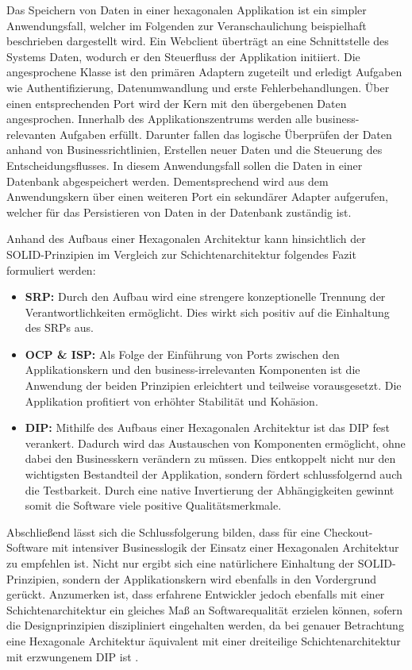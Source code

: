 Das Speichern von Daten in einer hexagonalen Applikation ist ein simpler Anwendungsfall, welcher im Folgenden zur Veranschaulichung beispielhaft beschrieben dargestellt wird. Ein Webclient überträgt an eine Schnittstelle des Systems Daten, wodurch er den Steuerfluss der Applikation initiiert. Die angesprochene Klasse ist den primären Adaptern zugeteilt und erledigt Aufgaben wie Authentifizierung, Datenumwandlung und erste Fehlerbehandlungen. Über einen entsprechenden Port wird der Kern mit den übergebenen Daten angesprochen. Innerhalb des Applikationszentrums werden alle business-relevanten Aufgaben erfüllt. Darunter fallen das logische Überprüfen der Daten anhand von Businessrichtlinien, Erstellen neuer Daten und die Steuerung des Entscheidungsflusses. In diesem Anwendungsfall sollen die Daten in einer Datenbank abgespeichert werden. Dementsprechend wird aus dem Anwendungskern über einen weiteren Port ein sekundärer Adapter aufgerufen, welcher für das Persistieren von Daten in der Datenbank zuständig ist.

Anhand des Aufbaus einer Hexagonalen Architektur kann hinsichtlich der SOLID-Prinzipien im Vergleich zur Schichtenarchitektur folgendes Fazit formuliert werden:

\begin{itemize}[topsep=-2pt]
	\item \textbf{\acrshort{SRP}: } {Durch den Aufbau wird eine strengere konzeptionelle Trennung der Verantwortlichkeiten ermöglicht. Dies wirkt sich positiv auf die Einhaltung des \acrlong{SRP}s aus.}
	\item \textbf{\acrshort{OCP} \& \acrshort{ISP}: } {Als Folge der Einführung von Ports zwischen den Applikationskern und den business-irrelevanten Komponenten ist die Anwendung der beiden Prinzipien erleichtert und teilweise vorausgesetzt. Die Applikation profitiert von erhöhter Stabilität und Kohäsion. }
	\item \textbf{\acrshort{DIP}: } {Mithilfe des Aufbaus einer Hexagonalen Architektur ist das \acrlong{DIP} fest verankert. Dadurch wird das Austauschen von Komponenten ermöglicht, ohne dabei den Businesskern verändern zu müssen. Dies entkoppelt nicht nur den wichtigsten Bestandteil der Applikation, sondern fördert schlussfolgernd auch die Testbarkeit. Durch eine native Invertierung der Abhängigkeiten gewinnt somit die Software viele positive Qualitätsmerkmale. \cite{Alliaume.2018, Martinez.2021}}
\end{itemize}


Abschließend lässt sich die Schlussfolgerung bilden, dass für eine Checkout-Software mit intensiver Businesslogik der Einsatz einer Hexagonalen Architektur zu empfehlen ist. Nicht nur ergibt sich eine natürlichere Einhaltung der SOLID-Prinzipien, sondern der Applikationskern wird ebenfalls in den Vordergrund gerückt. Anzumerken ist, dass erfahrene Entwickler jedoch ebenfalls mit einer Schichtenarchitektur ein gleiches Maß an Softwarequalität erzielen können, sofern die Designprinzipien diszipliniert eingehalten werden, da bei genauer Betrachtung eine Hexagonale Architektur äquivalent mit einer dreiteilige Schichtenarchitektur mit erzwungenem \acrlong{DIP} ist \cite{Seemann.2013} \cite[S. 125ff.]{Vernon.2015}. 

